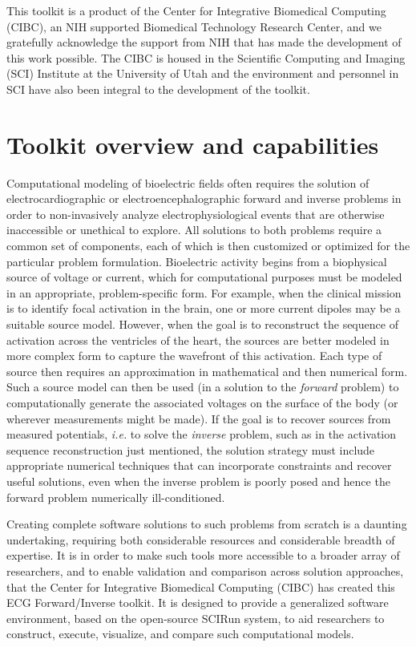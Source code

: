 \begin{introduction}
This toolkit is a product of the Center for Integrative Biomedical
Computing (CIBC), an NIH supported Biomedical Technology Research Center,
and we gratefully acknowledge the support from NIH that has made the
development of this work possible. The CIBC is housed in the Scientific
Computing and Imaging (SCI) Institute at the University of Utah and the
environment and personnel in SCI have also been integral to the development of the toolkit.

\end{introduction}

\section{Toolkit overview and capabilities}

Computational modeling of bioelectric fields often requires the solution of
electrocardiographic or electroencephalographic forward and inverse
problems in order to non-invasively analyze electrophysiological events
that are otherwise inaccessible or unethical to explore. All solutions to
both problems require a common set of components, each of which is then
customized or optimized for the particular problem formulation.
Bioelectric activity begins from a biophysical source of voltage or current,
which for computational purposes must be modeled in an appropriate,
problem-specific form. For example, when the clinical mission is to
identify focal activation in the brain, one or more current dipoles may be
a suitable source model. However, when the goal is to reconstruct the
sequence of activation across the ventricles of the heart, the sources are
better modeled in more complex form to capture the wavefront of this
activation. Each type of source then requires an approximation in
mathematical and then numerical form. Such a source model can then be used
(in a solution to the \textit{forward} problem) to computationally generate
the associated voltages on the surface of the body (or wherever
measurements might be made). If the goal is to recover sources from
measured potentials, \textit{i.e.} to solve the \textit{inverse} problem,
such as in the activation sequence reconstruction just mentioned, the
solution strategy must include appropriate numerical techniques that can
incorporate constraints and recover useful solutions, even when the inverse
problem is poorly posed and hence the forward problem numerically ill-conditioned.

Creating complete software solutions to such problems from scratch is a
daunting undertaking, requiring both considerable resources and considerable
breadth of expertise. It is in order to make such tools more accessible to
a broader array of researchers, and to enable validation and comparison
across solution approaches, that the Center for Integrative Biomedical
Computing (CIBC) has created this ECG Forward/Inverse toolkit. It is
designed to provide a generalized software environment, based on the open-source
SCIRun system, to aid researchers to construct, execute, visualize,
and compare such computational models.

